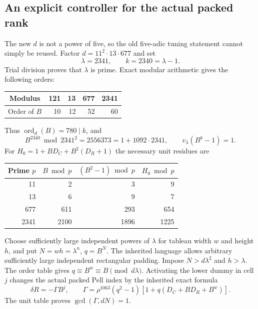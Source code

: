 \subsection{An explicit controller for the actual packed rank}

The new $d$ is not a power of five, so the old five-adic tuning statement
cannot simply be reused.  Factor $d=11^2\cdot13\cdot677$ and set
\[
 \lambda=2341,\qquad k=2340=\lambda-1.
\]
Trial division proves that $\lambda$ is prime.  Exact modular arithmetic
gives the following orders:
\begin{center}
\begin{tabular}{c|rrrr}
Modulus & 121 & 13 & 677 & 2341\\ \hline
Order of $B$ & 10 & 12 & 52 & 60
\end{tabular}
\end{center}
Thus $\operatorname{ord}_d(B)=780\mid k$, and
\[
 B^{2340}\bmod2341^2=2556373=1+1092\cdot2341,
 \qquad v_\lambda(B^k-1)=1.
\]
For $H_0=1+BD_C+B^2(D_R+1)$ the necessary unit residues are
\begin{center}
\begin{tabular}{r|rrr}
Prime $p$ & $B\bmod p$ & $(B^2-1)\bmod p$ & $H_0\bmod p$\\ \hline
11   & 2    & 3    & 9\\
13   & 6    & 9    & 7\\
677  & 611  & 293  & 654\\
2341 & 2100 & 1896 & 1225
\end{tabular}
\end{center}

Choose sufficiently large independent powers of $\lambda$ for tableau
width $w$ and height $h$, and put $N=wh=\lambda^n$, $q=B^N$.
The inherited language allows arbitrary sufficiently large independent
rectangular padding.  Impose $N>d\lambda^2$ and $h>\lambda$.
The order table gives $q\equiv B^w\equiv B\pmod{d\lambda}$.
Activating the lower dummy in cell $j$ changes the actual packed Pell
index by the inherited exact formula
\[
 \delta R=-\Gamma B^j,\qquad
 \Gamma=\rho^{1063}(q^2-1)
             [1+q(D_C+BD_R+B^w)].
\]
The unit table proves $\gcd(\Gamma,dN)=1$.

